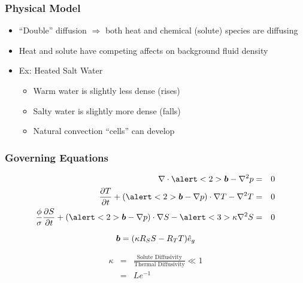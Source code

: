 \begin{frame}
  \frametitle{Physical Model}
      \begin{itemize}
      \item{``Double'' diffusion $\Rightarrow$ both heat and chemical (solute) species are diffusing}
      \item{Heat and solute have competing affects on background fluid density}
      \item{Ex: Heated Salt Water
	\begin{itemize}
	\item{Warm water is slightly less dense (rises)}
	\item{Salty water is slightly more dense (falls)}
	\item{Natural convection ``cells'' can develop }
	\end{itemize}
      }
      \end{itemize}
\end{frame}

\begin{frame}[t]
  \frametitle{Governing Equations}
  \begin{eqnarray}
    \label{eqn:p_strong}
    \nabla \cdot \alert<2>{\bv{b}} - \nabla^2 p &=& 0 \\
    \label{eqn:T_strong}
    \D{T}{t} + \left( \alert<2>{\bv{b}}-\nabla p\right) \cdot \nabla T - \nabla^2{T} &=&0 \\
    \label{eqn:S_strong}
    \frac{\phi}{\sigma} \D{S}{t} +
    \left( \alert<2>{\bv{b}}-\nabla p\right) \cdot \nabla S -  \alert<3>{\kappa} \nabla^2{S}&=&0 
  \end{eqnarray}

  {
    \begin{equation}
      \nonumber
      {\boldsymbol{b}} = ( \kappa R_S S - R_T T ) \hat{e}_{g}
    \end{equation}
  }

  {
    \begin{eqnarray}
      \nonumber
      \kappa &=& \frac{\text{Solute Diffusivity}}{\text{Thermal Diffusivity}} \ll 1 \\
      \nonumber
      &=& Le^{-1}
    \end{eqnarray}
  }
\end{frame}


